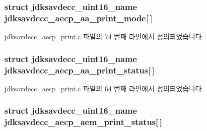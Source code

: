 \subsubsection[{\texorpdfstring{jdksavdecc\+\_\+aecp\+\_\+aa\+\_\+print\+\_\+mode}{jdksavdecc_aecp_aa_print_mode}}]{\setlength{\rightskip}{0pt plus 5cm}struct {\bf jdksavdecc\+\_\+uint16\+\_\+name} jdksavdecc\+\_\+aecp\+\_\+aa\+\_\+print\+\_\+mode\mbox{[}$\,$\mbox{]}}\hypertarget{group__aecp__print_ga2369362280dbb67a80ddca83ce8ef807}{}\label{group__aecp__print_ga2369362280dbb67a80ddca83ce8ef807}


jdksavdecc\+\_\+aecp\+\_\+print.\+c 파일의 74 번째 라인에서 정의되었습니다.

\subsubsection[{\texorpdfstring{jdksavdecc\+\_\+aecp\+\_\+aa\+\_\+print\+\_\+status}{jdksavdecc_aecp_aa_print_status}}]{\setlength{\rightskip}{0pt plus 5cm}struct {\bf jdksavdecc\+\_\+uint16\+\_\+name} jdksavdecc\+\_\+aecp\+\_\+aa\+\_\+print\+\_\+status\mbox{[}$\,$\mbox{]}}\hypertarget{group__aecp__print_ga44190bbd7791bc071cd082a8d791b4d2}{}\label{group__aecp__print_ga44190bbd7791bc071cd082a8d791b4d2}


jdksavdecc\+\_\+aecp\+\_\+print.\+c 파일의 64 번째 라인에서 정의되었습니다.

\subsubsection[{\texorpdfstring{jdksavdecc\+\_\+aecp\+\_\+aem\+\_\+print\+\_\+status}{jdksavdecc_aecp_aem_print_status}}]{\setlength{\rightskip}{0pt plus 5cm}struct {\bf jdksavdecc\+\_\+uint16\+\_\+name} jdksavdecc\+\_\+aecp\+\_\+aem\+\_\+print\+\_\+status\mbox{[}$\,$\mbox{]}}\hypertarget{group__aecp__print_gadd819ed386f3ae5573685eb11ff930d9}{}\label{group__aecp__print_gadd819ed386f3ae5573685eb11ff930d9}


